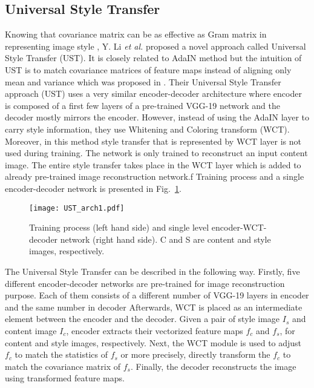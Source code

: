\documentclass{llncs}
\begin{document}
\subsection{Universal Style Transfer}
Knowing that covariance matrix can be as effective as Gram matrix in representing image style \cite{cov:gram}, Y. Li \textit{et al.} \cite{universal:style} proposed a novel approach called Universal Style Transfer (UST). It is closely related to AdaIN method but the intuition of UST is to match covariance matrices of feature maps instead of aligning only mean and variance which was proposed in \cite{huang:belongie}. Their Universal Style Transfer approach (UST) uses a very similar encoder-decoder architecture where encoder is composed of a first few layers of a pre-trained VGG-19 network and the decoder mostly mirrors the encoder. However, instead of using the AdaIN layer to carry style information, they use Whitening and Coloring transform (WCT). Moreover, in this method style transfer that is represented by WCT layer is not used during training. The network is only trained to reconstruct an input content image. The entire style transfer takes place in the WCT layer which is added to already pre-trained image reconstruction network.f Training process and a single encoder-decoder network is presented in Fig.~\ref{ust:arch1}.

\begin{figure}[H]
  \centering
  \texttt{[image: UST\_arch1.pdf]}
  \caption{Training process (left hand side) and single level encoder-WCT-decoder network (right hand side). C and S are content and style images, respectively. \label{ust:arch1}}
\end{figure}

The Universal Style Transfer can be described in the following way. Firstly, five different encoder-decoder networks are pre-trained for image reconstruction purpose. Each of them consists of a different number of VGG-19 layers in encoder and the same number in decoder %
Afterwards, WCT is placed as an intermediate element between the encoder and the decoder. Given a pair of style image $I_s$ and content image $I_c$, encoder extracts their vectorized feature maps $f_c$ and $f_s$, for content and style images, respectively. Next, the WCT module is used to adjust $f_c$ to match the statistics of $f_s$ or more precisely, directly transform the $f_c$ to match the covariance matrix of $f_s$. Finally, the decoder reconstructs the image using transformed feature maps.
\end{document}
